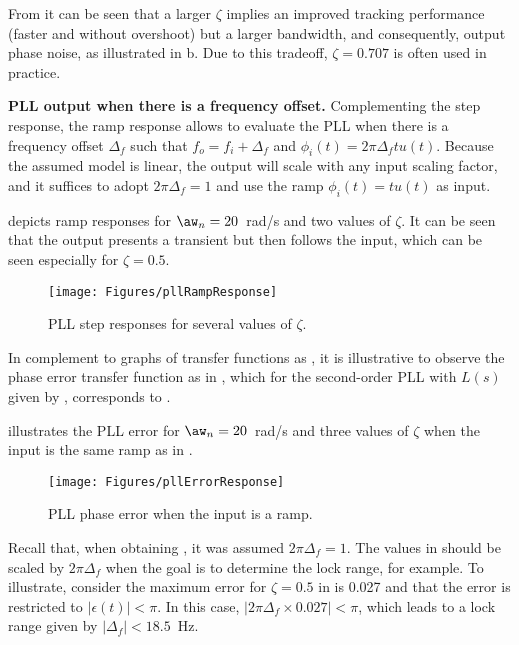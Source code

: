 From  it can be seen that a larger $\zeta$ implies an improved
 tracking performance (faster and without overshoot) but a larger bandwidth, and consequently, output phase noise, as illustrated in b. Due to this
tradeoff, $\zeta = 0.707$ is often used in practice.

\bExample \textbf{PLL output when there is a frequency offset.}
Complementing the step response, the ramp response allows to evaluate the PLL when
there is a frequency offset $\Delta_f$ such that $f_o = f_i + \Delta_f$ and $\phi_i(t) = 2 \pi \Delta_f t u(t)$. Because the assumed model is linear, the output will scale with any
 input scaling factor, and it suffices to adopt $2 \pi \Delta_f=1$ and use the ramp $\phi_i(t) = t u(t)$ as input.

 depicts ramp responses for $\aw_n = 20$~rad/s and two values of $\zeta$. It can be seen that the output presents a transient but then follows the input, which 
can be seen especially for $\zeta=0.5$.

\begin{figure}[htbp]
\centering
\texttt{[image: Figures/pllRampResponse]}
\caption{PLL step responses for several values of $\zeta$.\label{fig:pllRampResponse}}
\end{figure}

In complement to graphs of transfer functions as , it is
illustrative to observe the phase error transfer function as in
, which for the second-order PLL with $L(s)$ given by , corresponds to .

 illustrates the PLL error for $\aw_n = 20$~rad/s and three values of $\zeta$ when the input is the same ramp as in .

\begin{figure}[htbp]
\centering
\texttt{[image: Figures/pllErrorResponse]}
\caption{PLL phase error when the input is a ramp.\label{fig:pllErrorResponse}}
\end{figure}

Recall that, when obtaining , it was assumed $2 \pi \Delta_f=1$.
The values in  should be scaled by $2 \pi \Delta_f$ 
when the goal is to determine
the lock range, for example. To illustrate, consider the maximum error for $\zeta=0.5$ in  is 0.027 and that the error is restricted to $|\epsilon(t)|<\pi$.
In this case, $|2 \pi \Delta_f \times 0.027| < \pi$, which leads to a lock range given
by $|\Delta_f| < 18.5$~Hz.
\eExample 

